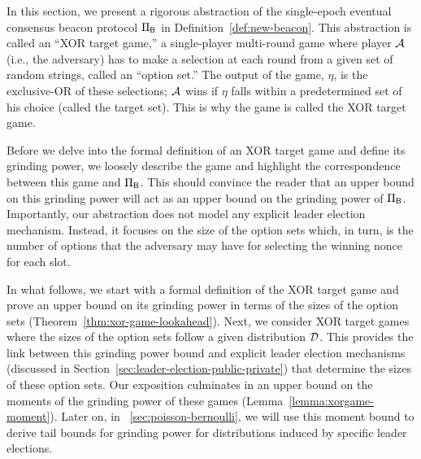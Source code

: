 

In this section, 
we present a rigorous abstraction of the 
single-epoch eventual consensus beacon protocol $\Pi_{\mathsf{B}}$ in Definition~\ref{def:new-beacon}. 
This abstraction is called an ``XOR target game,'' 
a single-player multi-round game where player $\mathcal{A}$ (i.e., the adversary) 
has to make a selection at each round from a given set of random strings, 
called an ``option set.''
The output of the game, $\eta$, is the exclusive-OR of these selections; 
$\mathcal{A}$ wins if $\eta$ falls within 
a predetermined set of his choice (called the target set). 
This is why the game is called the XOR target game.

Before we delve into the formal definition of an XOR target game 
and define its grinding power, 
we loosely describe the game and highlight the correspondence 
between this game and $\Pi_{\mathsf{B}}$. 
This should convince the reader that 
an upper bound on this grinding power will act as an upper bound on the grinding power of $\Pi_{\mathsf{B}}$.
Importantly, our abstraction does not model any explicit leader election mechanism. 
Instead, it focuses on the size of the option sets 
which, in turn, is the number of options that the adversary may have 
for selecting the winning nonce for each slot. 



In what follows, we start with a formal definition of the XOR target game 
and prove an upper bound on its grinding power 
in terms of the sizes of the option sets (Theorem~\ref{thm:xor-game-lookahead}). 
Next, we consider XOR target games  
where the sizes of the option sets follow a given distribution $\mathcal{D}$. 
This provides the link between this grinding power bound 
and explicit leader election mechanisms (discussed in Section~\ref{sec:leader-election-public-private})
that determine the sizes of these option sets. 
Our exposition culminates in an upper bound 
on the moments of the grinding power of these games (Lemma~\ref{lemma:xorgame-moment}). 
Later on, in \Section~\ref{sec:poisson-bernoulli}, 
we will use this moment bound to derive tail bounds for grinding power 
for distributions induced by specific leader elections.



